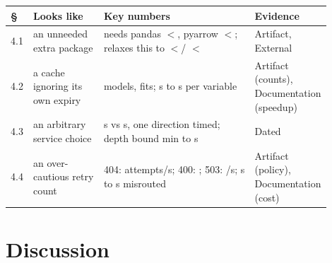\begin{wtable}
\centering
\tabscale
\caption{The four findings, what each decision looks like without its
measurement, and this paper's evidence grade for the headline numbers (see
\texttt{shared/generated/macros.tex} for the full per-group grading).
Artifact = a committed report/data file or a currently-passing test
reproduces the number on demand; Documentation = descriptive, reproducible
prose with no stored benchmark output; Dated = a single, named-date
measurement with no committed artifact; External = checked live against a
third party's own published metadata.}
\label{tab:findings}
\begin{tabular}{p{0.04\linewidth}p{0.22\linewidth}p{0.47\linewidth}p{0.17\linewidth}}
\toprule
\S & Looks like & Key numbers & Evidence \\
\midrule
4.1 & an unneeded extra package & \MlflowMatchedVersion{} needs pandas
$<$\MlflowMatchedPandasCeiling{}, pyarrow $<$\MlflowMatchedPyarrowCeiling{};
\MlflowLatestVersion{} relaxes this to $<$\MlflowLatestPandasCeiling{}/
$<$\MlflowLatestPyarrowCeiling{} & Artifact, External \\
4.2 & a cache ignoring its own expiry & \NModelsAudited{} models,
\NHeldoutFits{} fits; \AuditSecondsUncached{}s to \AuditSecondsCached{}s
per variable & Artifact (counts), Documentation (speedup) \\
4.3 & an arbitrary service choice & \ArcoGeoSeriesSeconds{}s vs
\ArcoTimeSeriesSeconds{}s, one direction timed; depth bound
\ReanalysisUnboundedMinutes{}min to \ReanalysisBoundedSeconds{}s & Dated \\
4.4 & an over-cautious retry count & 404: \RetryAttemptsFourZeroFour{}
attempts/\RetrySecondsFourZeroFour{}s; 400: \RetryAttemptsFourHundred{};
503: \RetryAttemptsFiveZeroThree{}/\RetrySecondsFiveZeroThree{}s;
\WarmForecastCodeSeconds{}s to \WarmForecastAfterBadRetrySeconds{}s
misrouted & Artifact (policy), Documentation (cost) \\
\bottomrule
\end{tabular}
\end{wtable}

\section{Discussion}

